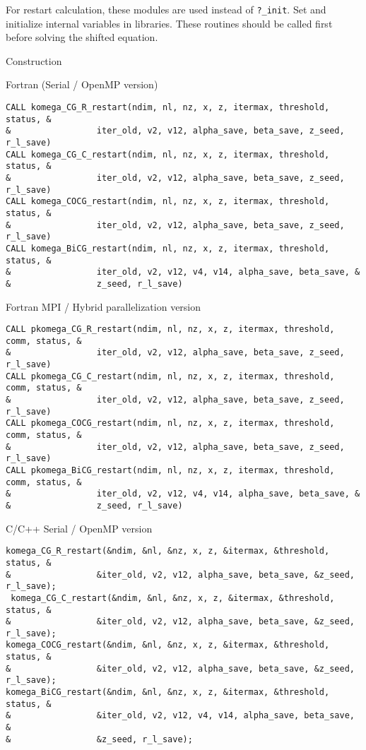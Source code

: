 \documentclass[12pt,titlepage]{article}
\begin{document}
 For restart calculation, these modules are used instead of \verb|?_init|.
Set and initialize internal variables in libraries.
These routines should be called first before solving the shifted equation.

  \noindent Construction
  
  \noindent Fortran (Serial / OpenMP version)
  
\begin{verbatim}
CALL komega_CG_R_restart(ndim, nl, nz, x, z, itermax, threshold, status, &
&                 iter_old, v2, v12, alpha_save, beta_save, z_seed, r_l_save)
CALL komega_CG_C_restart(ndim, nl, nz, x, z, itermax, threshold, status, &
&                 iter_old, v2, v12, alpha_save, beta_save, z_seed, r_l_save)
CALL komega_COCG_restart(ndim, nl, nz, x, z, itermax, threshold, status, &
&                 iter_old, v2, v12, alpha_save, beta_save, z_seed, r_l_save)
CALL komega_BiCG_restart(ndim, nl, nz, x, z, itermax, threshold, status, &
&                 iter_old, v2, v12, v4, v14, alpha_save, beta_save, &
&                 z_seed, r_l_save)
\end{verbatim}

  \noindent Fortran MPI / Hybrid parallelization version
  
\begin{verbatim}
CALL pkomega_CG_R_restart(ndim, nl, nz, x, z, itermax, threshold, comm, status, &
&                 iter_old, v2, v12, alpha_save, beta_save, z_seed, r_l_save)
CALL pkomega_CG_C_restart(ndim, nl, nz, x, z, itermax, threshold, comm, status, &
&                 iter_old, v2, v12, alpha_save, beta_save, z_seed, r_l_save)
CALL pkomega_COCG_restart(ndim, nl, nz, x, z, itermax, threshold, comm, status, &
&                 iter_old, v2, v12, alpha_save, beta_save, z_seed, r_l_save)
CALL pkomega_BiCG_restart(ndim, nl, nz, x, z, itermax, threshold, comm, status, &
&                 iter_old, v2, v12, v4, v14, alpha_save, beta_save, &
&                 z_seed, r_l_save)
\end{verbatim}

\noindent C/C++ Serial / OpenMP version
  
\begin{verbatim}
komega_CG_R_restart(&ndim, &nl, &nz, x, z, &itermax, &threshold, status, &
&                 &iter_old, v2, v12, alpha_save, beta_save, &z_seed, r_l_save);
 komega_CG_C_restart(&ndim, &nl, &nz, x, z, &itermax, &threshold, status, &
&                 &iter_old, v2, v12, alpha_save, beta_save, &z_seed, r_l_save);
komega_COCG_restart(&ndim, &nl, &nz, x, z, &itermax, &threshold, status, &
&                 &iter_old, v2, v12, alpha_save, beta_save, &z_seed, r_l_save);
komega_BiCG_restart(&ndim, &nl, &nz, x, z, &itermax, &threshold, status, &
&                 &iter_old, v2, v12, v4, v14, alpha_save, beta_save, &
&                 &z_seed, r_l_save);
\end{verbatim}
\end{document}
